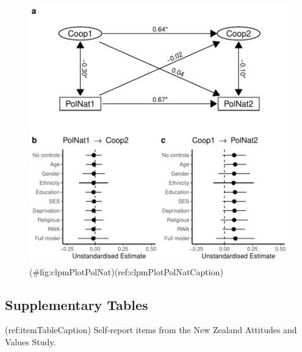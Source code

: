 \begin{appendix}
\begin{figure}
\centering
\includegraphics{manuscript_files/figure-latex/clpmPlotPolNat-1.pdf}
\caption{(\#fig:clpmPlotPolNat)(ref:clpmPlotPolNatCaption)}
\end{figure}

\newpage

\hypertarget{supplementary-tables}{%
\subsection{Supplementary Tables}\label{supplementary-tables}}

(ref:itemTableCaption) Self-report items from the New Zealand Attitudes
and Values Study.


\end{appendix}
